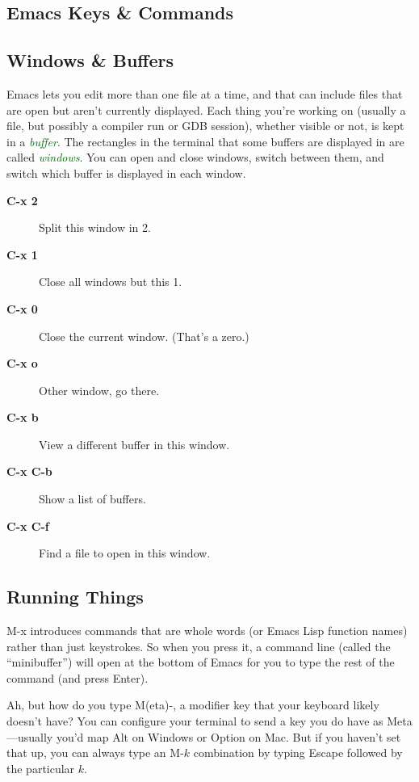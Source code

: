 \documentclass[11pt]{article}
\newcommand\keyterm[1]{\textcolor[HTML]{006600}{\emph{#1}}}
\newcommand\keycombo[1]{{\sffamily\upshape\bfseries#1}}
\newenvironment{commands}
{\bgroup
  \let\olditem\item
  \def\item[##1]{\olditem[\keycombo{##1}]}%
  \begin{description}}
  {\end{description}\egroup}
\begin{document}
\begin{multicols}{2}
\section*{Emacs Keys \& Commands}

\subsection*{Windows \& Buffers}

Emacs lets you edit more than one file at a time, and that can include
  files that are open but aren’t currently displayed. Each thing you’re
  working on (usually a file, but possibly a compiler run or GDB
  session), whether visible or not, is kept in a \keyterm{buffer}. The
  rectangles in the terminal that some buffers are displayed in are called
  \keyterm{windows}. You can open and close windows, switch between them,
  and switch which buffer is displayed in each window.

\begin{commands}
\item[C-x 2] Split this window in 2.
\item[C-x 1] Close all windows but this 1.
\item[C-x 0] Close the current window. (That's a zero.)
\item[C-x o] Other window, go there.
\item[C-x b] View a different buffer in this window.
\item[C-x C-b] Show a list of buffers.
\item[C-x C-f] Find a file to open in this window.
\end{commands}

\subsection*{Running Things}

\textsf{M-x} introduces commands that are whole words (or Emacs Lisp
  function names) rather than just keystrokes. So when you press it, a
  command line (called the ``minibuffer'') will open at the bottom of
  Emacs for you to type the rest of the command (and press Enter).

  Ah, but how do you type \textsf{M(eta)-}, a modifier key that your
  keyboard likely doesn’t have? You can configure your terminal to send
  a key you do have as \textsf{Meta}—usually you’d map \textsf{Alt} on
  Windows or \textsf{Option} on Mac. But if you haven’t set that up, you
  can always type an \textsf{M-}$k$ combination by typing
  \textsf{Escape} followed by the particular $k$.


\end{multicols}
\end{document}
